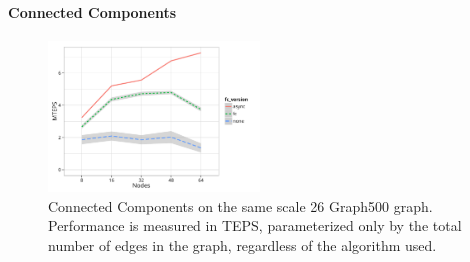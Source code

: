 \paragraph{Connected Components}

\begin{figure}[t]
  \centering
  \includegraphics[width=0.5\textwidth]{data/plots/cc_perf.pdf}
  \caption{Connected Components on the same scale 26 Graph500 graph. Performance is measured in TEPS, parameterized only by the total number of edges in the graph, regardless of the algorithm used.}
  \label{fig:cc_perf}
\end{figure}

